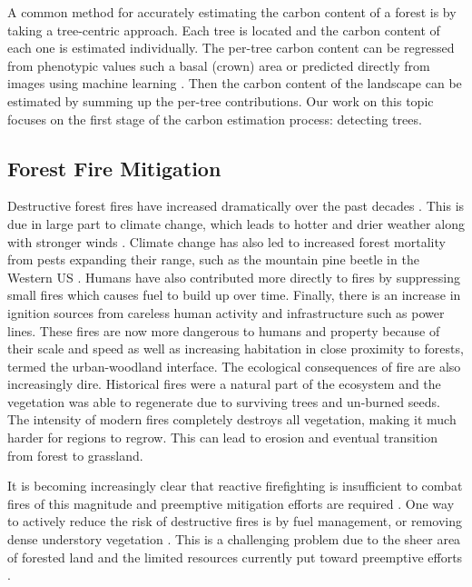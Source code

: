 A common method for accurately estimating the carbon content of a forest is by taking a tree-centric approach. Each tree is located and the carbon content of each one is estimated individually. The per-tree carbon content can be regressed from phenotypic values such a basal (crown) area \cite{Torres2013UsingMexico} or predicted directly from images using machine learning \cite{Reiersen2022ReforesTree:Imagery}. Then the carbon content of the landscape can be estimated by summing up the per-tree contributions. Our work on this topic focuses on the first stage of the carbon estimation process: detecting trees.

\subsection{Forest Fire Mitigation} 
Destructive forest fires have increased dramatically over the past decades \cite{spreading_like_wildfire, ayanz2021, nfn2022}. This is due in large part to climate change, which leads to hotter and drier weather along with stronger winds \cite{spreading_like_wildfire}. Climate change has also led to increased forest mortality from pests expanding their range, such as the mountain pine beetle in the Western US \cite{Jenkins2014AndFuels}. Humans have also contributed more directly to fires by suppressing small fires which causes fuel to build up over time. Finally, there is an increase in ignition sources from careless human activity and infrastructure such as power lines. These fires are now more dangerous to humans and property because of their scale and speed as well as increasing habitation in close proximity to forests, termed the urban-woodland interface. The ecological consequences of fire are also increasingly dire. Historical fires were a natural part of the ecosystem and the vegetation was able to regenerate due to surviving trees and un-burned seeds. The intensity of modern fires completely destroys all vegetation, making it much harder for regions to regrow. This can lead to erosion and eventual transition from forest to grassland.

It is becoming increasingly clear that reactive firefighting is insufficient to combat fires of this magnitude and preemptive mitigation efforts are required \cite{spreading_like_wildfire}. One way to actively reduce the risk of destructive fires is by fuel management, or removing dense understory vegetation \cite{Fire2021FuelsManagement, WildlandFireResiliencyProgram20214Plan, Agriculture2019HazardousComplex}. This is a challenging problem due to the sheer area of forested land and the limited resources currently put toward preemptive efforts \cite{spreading_like_wildfire}.

